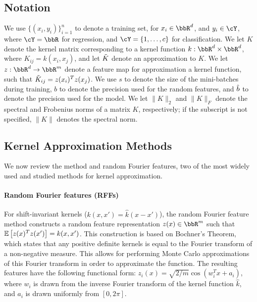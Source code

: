 \subsection{Notation}
We use $\{(x_i,y_i)\}_{i=1}^n$ to denote a training set, for $x_i \in \RR^d$, and $y_i \in \cY$, where $\cY = \RR$ for regression, and $\cY = \{1,\ldots,c\}$ for classification.  We let $K$ denote the kernel matrix corresponding to a kernel function $k:\RR^d\times\RR^d$, where $K_{ij} = k(x_i,x_j)$, and let $\tilde{K}$ denote an approximation to $K$. We let $z:\RR^d\rightarrow\RR^m$ denote a feature map for approximation a kernel function, such that $\tilde{K}_{ij} = z(x_i)^T z(x_j)$.  We use $s$ to denote the size of the mini-batches during training, $b$ to denote the precision used for the random features, and $\hat{b}$ to denote the precision used for the model.  We let $\|K\|_2$ and $\|K\|_F$ denote the spectral and Frobenius norms of a matrix $K$, respectively; if the subscript is not specified, $\|K\|$ denotes the spectral norm.

\subsection{Kernel Approximation Methods}
We now review the \Nystrom method and random Fourier features, two of the most widely used and studied methods for kernel approximation.

\paragraph{Random Fourier features (RFFs)}
For shift-invariant kernels ($k(x,x') = \hat{k}(x-x')$), the random Fourier 
feature method \citep{rahimi07random} constructs a random feature representation 
$z(x) \in \RR^m$ such that $\expect{}{z(x)^T z(x')} = k(x,x')$. This construction 
is based on Bochner's Theorem, which states that any positive definite kernels is 
equal to the Fourier transform of a non-negative measure. This allows for performing
Monte Carlo approximations of this Fourier transform in order to approximate the 
function.  The resulting features have the following functional form: 
$z_i(x) = \sqrt{2/m}\cos(w_i^Tx + a_i)$, where $w_i$ is drawn from the inverse Fourier
transform of the kernel function $\hat{k}$, and $a_i$ is drawn uniformly from $[0,2\pi]$. 


